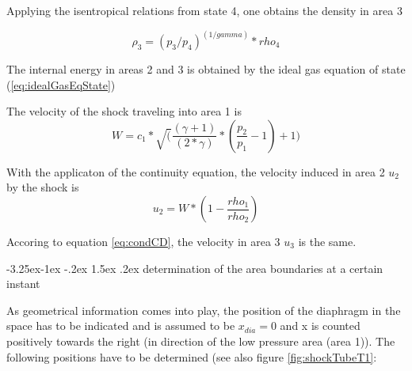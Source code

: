 \documentclass{report}
\makeatletter
\renewcommand\paragraph{\@startsection{paragraph}{4}{\z@}%
  {-3.25ex\@plus -1ex \@minus -.2ex}%
  {1.5ex \@plus .2ex}%
  {\normalfont\normalsize\bfseries}}
\makeatother
\begin{document}
Applying the isentropical relations from state 4, one obtains the density in area 3

\begin{equation}
\rho_3=(p_3/p_4)^(1/gamma)*rho_4
\end{equation}

The internal energy in areas 2 and 3 is obtained by the ideal gas equation of state (\ref{eq:idealGasEqState})

The velocity of the shock traveling into area 1 is
\begin{equation}
\label{eq:shockVelocity}
W=c_1*\sqrt(\frac{(\gamma+1)}{(2*\gamma)}*(\frac{p_2}{p_1}-1)+1)
\end{equation}

With the applicaton of the continuity equation, the velocity induced in area 2 $u_2$ by the shock is
\begin{equation}
 u_2=W*(1-\frac{rho_1}{rho_2})
\end{equation}

Accoring to equation \ref{eq:condCD}, the velocity in area 3 $u_3$ is the same.

\paragraph{determination of the area boundaries at a certain instant}

As geometrical information comes into play, the position of the diaphragm in the space has to be indicated and is assumed to be $x_{dia}=0$ and x is counted positively towards the right (in direction of the low pressure area (area 1)).
The following positions have to be determined (see also figure \ref{fig:shockTubeT1}:
\end{document}
